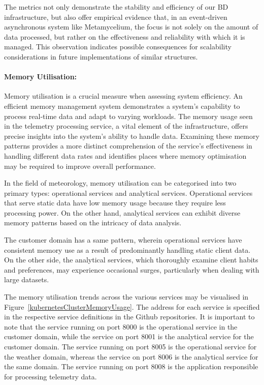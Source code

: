 \documentclass[preprint,12pt]{elsarticle}
\begin{document}
The metrics not only demonstrate the stability and efficiency of our BD infrastructure, but also offer empirical evidence that, in an event-driven asynchronous system like Metamycelium, the focus is not solely on the amount of data processed, but rather on the effectiveness and reliability with which it is managed. This observation indicates possible consequences for scalability considerations in future implementations of similar structures.


\paragraph{Memory Utilisation:}

Memory utilisation is a crucial measure when assessing system efficiency. An efficient memory management system demonstrates a system's capability to process real-time data and adapt to varying workloads. The memory usage seen in the telemetry processing service, a vital element of the infrastructure, offers precise insights into the system's ability to handle data. Examining these memory patterns provides a more distinct comprehension of the service's effectiveness in handling different data rates and identifies places where memory optimisation may be required to improve overall performance.

In the field of meteorology, memory utilisation can be categorised into two primary types: operational services and analytical services. Operational services that serve static data have low memory usage because they require less processing power. On the other hand, analytical services can exhibit diverse memory patterns based on the intricacy of data analysis.

The customer domain has a same pattern, wherein operational services have consistent memory use as a result of predominantly handling static client data. On the other side, the analytical services, which thoroughly examine client habits and preferences, may experience occasional surges, particularly when dealing with large datasets.

The memory utilisation trends across the various services may be visualised in Figure~\ref{kubernetesClusterMemoryUsage}. The address for each service is specified in the respective service definitions in the Github repositories. It is important to note that the service running on port 8000 is the operational service in the customer domain, while the service on port 8001 is the analytical service for the customer domain. The service running on port 8005 is the operational service for the weather domain, whereas the service on port 8006 is the analytical service for the same domain. The service running on port 8008 is the application responsible for processing telemetry data.
\end{document}
